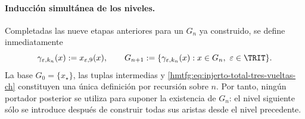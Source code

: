 \paragraph{Inducción simultánea de los niveles.}
Completadas las nueve etapas anteriores para un \(G_n\) ya construido,
se define inmediatamente
\begin{equation}
 \gamma_{\varepsilon,k_n}(x):=x_{\varepsilon,9}(x),\qquad
 G_{n+1}:=\{\gamma_{\varepsilon,k_n}(x):
       x\in G_n,\ \varepsilon\in\TRIT\}.
 \label{hmtfg:eq:injerto-total-tres-vueltas-ch}
\end{equation}
\label{hmtfg:eq:tres-vueltas-tpk-ch}
La base \(G_0=\{x_\star\}\), las tuplas intermedias y
\eqref{hmtfg:eq:injerto-total-tres-vueltas-ch} constituyen una única definición por
recursión sobre \(n\). Por tanto, ningún portador posterior se utiliza para
suponer la existencia de \(G_n\): el nivel siguiente sólo se introduce
después de construir todas sus aristas desde el nivel precedente.

